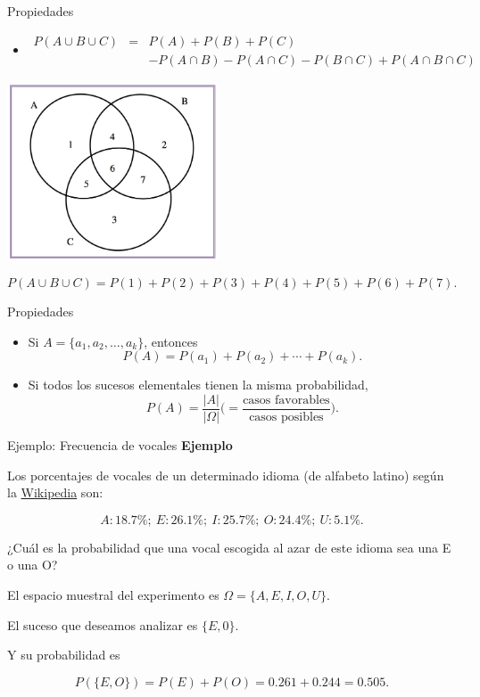 \documentclass[
  ignorenonframetext,
]{beamer}
\providecommand{\tightlist}{%
  \setlength{\itemsep}{0pt}\setlength{\parskip}{0pt}}
\begin{document}
\begin{frame}{Propiedades}
\protect\hypertarget{propiedades-10}{}
\begin{itemize}
\tightlist
\item
  \[\begin{eqnarray*}
  P(A\cup B\cup C)&=&P(A)+P(B)+P(C)  \\ &&-P(A\cap B)-P(A\cap C)-P(B\cap C)  +P(A\cap B\cap C)
  \end{eqnarray*}\]
\end{itemize}

\includegraphics[width=\textwidth,height=2.08333in]{Images/proba1dibujos/tresconjunts.jpg}

\[P(A\cup B\cup C)=P(1)+P(2)+P(3)+P(4)+P(5)+P(6)+P(7).\]
\end{frame}

\begin{frame}{Propiedades}
\protect\hypertarget{propiedades-11}{}
\begin{itemize}
\item
  Si \(A=\{a_1,a_2,\ldots,a_k\}\), entonces \[
  P(A)=P(a_1)+P(a_2)+\cdots+P(a_k).
  \]
\item
  Si todos los sucesos elementales tienen la misma probabilidad, \[
  P(A)=\frac{|A|}{|\Omega|}\Big(=\frac{\mbox{casos favorables}}{\mbox{casos posibles}}\Big).
  \]
\end{itemize}
\end{frame}

\begin{frame}{Ejemplo: Frecuencia de vocales}
\protect\hypertarget{ejemplo-frecuencia-de-vocales}{}
\textbf{Ejemplo}

Los porcentajes de vocales de un determinado idioma (de alfabeto latino)
según la
\href{https://es.wikipedia.org/wiki/Frecuencia_de_aparici\%C3\%B3n_de_letras}{Wikipedia}
son:

\[A: 18.7\%;\ E: 26.1\%;\ I: 25.7\%;\ O: 24.4\%;\ U: 5.1\%.\]

¿Cuál es la probabilidad que una vocal escogida al azar de este idioma
sea una E o una O?

El espacio muestral del experimento es \(\Omega=\{A,E,I,O,U\}\).

El suceso que deseamos analizar es \(\{E,0\}\).

Y su probabilidad es

\[P(\{E,O\})=P(E)+P(O)=0.261+0.244=0.505.\]
\end{frame}
\end{document}
